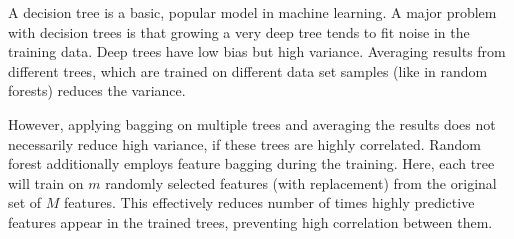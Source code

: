 A decision tree is a basic, popular model in machine learning.  A major problem
with decision trees is that growing a very deep tree tends to fit noise in the
training data.  Deep trees have low bias but high variance.  Averaging results
from different trees, which are trained on different data set samples (like in
random forests) reduces the variance.

However, applying bagging on multiple trees and averaging the results does not
necessarily reduce high variance, if these trees are highly correlated.  Random
forest additionally employs feature bagging during the training.  Here, each
tree will train on $m$ randomly selected features (with replacement) from the
original set of $M$ features.  This effectively reduces number of times highly
predictive features appear in the trained trees, preventing high correlation
between them.

